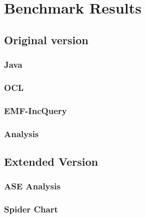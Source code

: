\chapter{Benchmark Results}

\section{Original version}
\subsection{Java}
\subsection{OCL}
\subsection{EMF-IncQuery}
\subsection{Analysis}

\section{Extended Version}
\subsection{ASE Analysis}
\subsection{Spider Chart}
